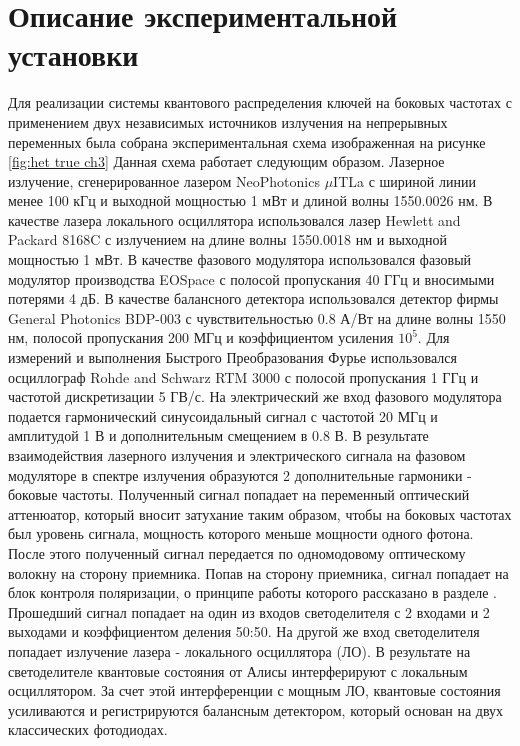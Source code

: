 \section{Описание экспериментальной установки}\label{sec:ch3/sect6}
Для реализации системы квантового распределения ключей на боковых частотах с применением двух независимых источников излучения на непрерывных переменных была собрана экспериментальная схема изображенная на рисунке \ref*{fig:het true ch3}
Данная схема работает следующим образом. Лазерное излучение, сгенерированное лазером NeoPhotonics $\mu$ITLa с шириной линии менее 100 кГц и выходной мощностью 1 мВт и длиной волны 1550.0026 нм. В качестве лазера локального осциллятора использовался лазер Hewlett and Packard 8168C с излучением на длине волны 1550.0018 нм и выходной мощностью 1 мВт. В качестве фазового модулятора использовался фазовый модулятор производства EOSpace с полосой пропускания 40 ГГц и вносимыми потерями 4 дБ.
В качестве балансного детектора использовался детектор фирмы General Photonics BDP-003 с чувствительностью 0.8 А/Вт на длине волны 1550 нм, полосой пропускания 200 МГц и коэффициентом усиления ${10^5}$.
Для измерений и выполнения Быстрого Преобразования Фурье использовался осциллограф Rohde and Schwarz RTM 3000 с полосой пропускания 1 ГГц и частотой дискретизации 5 ГВ/с.
На электрический же вход фазового модулятора подается гармонический синусоидальный сигнал с частотой 20 МГц и амплитудой 1 В и дополнительным смещением в 0.8 В. В результате взаимодействия лазерного излучения и электрического сигнала на фазовом модуляторе в спектре излучения образуются 2 дополнительные гармоники - боковые частоты.
Полученный сигнал попадает на переменный оптический аттенюатор, который вносит затухание таким образом, чтобы на боковых частотах был уровень сигнала, мощность которого меньше мощности одного фотона.
После этого полученный сигнал передается по одномодовому оптическому волокну на сторону приемника. Попав на сторону приемника, сигнал попадает на блок контроля поляризации, о принципе работы которого рассказано в разделе \cite{sec:ch3/sect4} . Прошедший сигнал попадает на один из входов светоделителя с 2 входами и 2 выходами и коэффициентом деления 50:50.
На другой же вход светоделителя попадает излучение лазера - локального осциллятора (ЛО). В результате на светоделителе квантовые состояния от Алисы интерферируют с локальным осциллятором. За счет этой интерференции с мощным ЛО, квантовые состояния усиливаются и регистрируются балансным детектором, который основан на двух классических фотодиодах.

